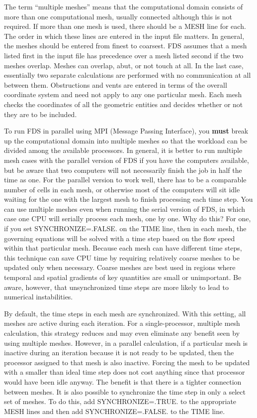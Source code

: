 \documentclass[11pt]{book}
\begin{document}
The term ``multiple meshes'' means that the computational domain consists of
more than one computational mesh, usually connected although this is not
required. If more than one mesh is used, there should be a
{\ct MESH} line for each. The order in which these
lines are entered in the input file matters. In general, the meshes should be entered
from finest to coarsest. FDS assumes that a mesh listed first in the input file has
precedence over a mesh listed second if the two meshes overlap.
Meshes can overlap, abut, or not touch at all. In the last case, essentially two separate
calculations are performed with no communication at all between them. Obstructions and vents are entered
in terms of the overall coordinate system and need not apply to any one particular mesh.
Each mesh checks the coordinates of all the geometric
entities and decides whether or not they are to be included.

To run FDS in parallel using MPI (Message Passing Interface), you {\bf must} break up the computational domain into
multiple meshes so that the workload can be divided among the available processors.
In general, it is better to run multiple mesh cases with the parallel version of FDS if you have the
computers available, but be aware that two computers will not necessarily finish the job in half the time as one. For the
parallel version to work well, there has to be a comparable number of cells in each mesh, or otherwise most of the computers will sit idle
waiting for the one with the largest mesh to finish processing each time step. You can use multiple meshes even when running the serial version of FDS,
in which case one CPU will serially process each mesh, one by one. Why do this?
For one, if you set {\ct SYNCHRONIZE=.FALSE.} on the {\ct TIME} line,
then in each mesh, the governing equations will be solved with a time
step based on the flow speed within that particular mesh. Because each
mesh can have different time steps, this technique can save CPU time by
requiring relatively coarse meshes to be updated only when necessary.
Coarse meshes are best used in regions where temporal and spatial gradients of key
quantities are small or unimportant. Be aware, however, that unsynchronized time steps are more likely to lead to numerical instabilities.

By default, the time steps in each mesh are synchronized.
With this setting, all meshes are active during each iteration.
For a single-processor, multiple mesh calculation, this strategy reduces
and may even eliminate any benefit seen by using multiple meshes. However, in a
parallel calculation, if a particular mesh is inactive during an iteration because
it is not ready to be updated, then the processor assigned to that mesh is also
inactive. Forcing the mesh to be updated with a smaller than ideal time step does not
cost anything since that processor would have been idle anyway. The benefit is that
there is a tighter connection between meshes.
It is also possible to synchronize the time step in only a select set of meshes. To do
this, add {\ct SYNCHRONIZE=.TRUE.} to the appropriate {\ct MESH} lines and then add
{\ct SYNCHRONIZE=.FALSE.} to the {\ct TIME} line.
\end{document}
